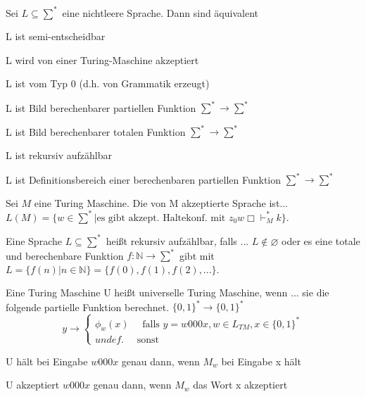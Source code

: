 \documentclass[avery5371, frame]{flashcards}
\begin{document}
\begin{flashcard}[Satz]{Sei $L\subseteq \sum^*$ eine nichtleere Sprache. Dann sind äquivalent}
    \begin{itemize*}
        \item L ist semi-entscheidbar
        \item L wird von einer Turing-Maschine akzeptiert
        \item L ist vom Typ 0 (d.h. von Grammatik erzeugt)
        \item L ist Bild berechenbarer partiellen Funktion $\sum^*\rightarrow\sum^*$
        \item L ist Bild berechenbarer totalen Funktion $\sum^*\rightarrow\sum^*$
        \item L ist rekursiv aufzählbar
        \item L ist Definitionsbereich einer berechenbaren partiellen Funktion $\sum^*\rightarrow\sum^*$
    \end{itemize*}
\end{flashcard}

\begin{flashcard}[Definition]{Sei $M$ eine Turing Maschine. Die von M akzeptierte Sprache ist...}
    $L(M)=\{ w\in\sum^* | \text{es gibt akzept. Haltekonf. mit } z_0w\Box\vdash_M^* k\}$.
\end{flashcard}

\begin{flashcard}[Definition]{ Eine Sprache $L\subseteq \sum^*$ heißt rekursiv aufzählbar, falls ... }
    $L\not\in\varnothing$ oder es eine totale und berechenbare Funktion $f:\mathbb{N}\rightarrow\sum^*$ gibt mit $L=\{f(n)| n\in\mathbb{N}\}=\{f(0), f(1),f(2),...\}$.
\end{flashcard}

\begin{flashcard}[Definition]{ Eine Turing Maschine U heißt universelle Turing Maschine, wenn ...}
    sie die folgende partielle Funktion berechnet. $\{0,1\}^*\rightarrow\{0,1\}^*$
    $$y\rightarrow\begin{cases} \phi_w(x) \quad\text{ falls } y=w000x,w\in L_{TM},x\in\{0,1\}^* \\ undef. \quad\text{ sonst}\end{cases}$$
    \begin{itemize*}
        \item U hält bei Eingabe $w000x$ genau dann, wenn $M_w$ bei Eingabe x hält
        \item U akzeptiert $w000x$ genau dann, wenn $M_w$ das Wort x akzeptiert
    \end{itemize*}
\end{flashcard}
\end{document}

